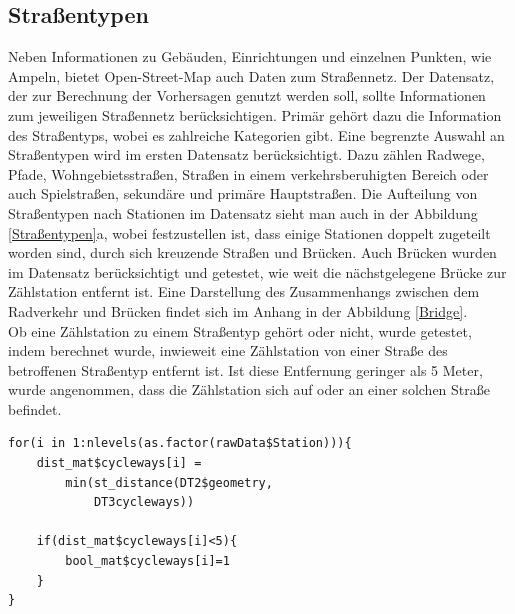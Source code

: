 \documentclass[a4paper,12pt]{thesis}
\begin{document}
\subsection{Straßentypen}

Neben Informationen zu Gebäuden, Einrichtungen und einzelnen Punkten, wie Ampeln, bietet Open-Street-Map auch Daten zum Straßennetz. Der Datensatz, der zur Berechnung der Vorhersagen genutzt werden soll, sollte Informationen zum jeweiligen Straßennetz berücksichtigen. Primär gehört dazu die Information des Straßentyps, wobei es zahlreiche Kategorien gibt. Eine begrenzte Auswahl an Straßentypen wird im ersten Datensatz berücksichtigt. Dazu zählen Radwege, Pfade, Wohngebietsstraßen, Straßen in einem verkehrsberuhigten Bereich oder auch Spielstraßen, sekundäre und primäre Hauptstraßen. Die Aufteilung von Straßentypen nach Stationen im Datensatz sieht man auch in der Abbildung \ref{Straßentypen}a, wobei festzustellen ist, dass einige Stationen doppelt zugeteilt worden sind, durch sich kreuzende Straßen und Brücken. Auch Brücken wurden im Datensatz berücksichtigt und getestet, wie weit die nächstgelegene Brücke zur Zählstation entfernt ist. Eine Darstellung des Zusammenhangs zwischen dem Radverkehr und Brücken findet sich im Anhang in der Abbildung \ref{Bridge}.\\

Ob eine Zählstation zu einem Straßentyp gehört oder nicht, wurde getestet, indem berechnet wurde, inwieweit eine Zählstation von einer Straße des betroffenen Straßentyp entfernt ist. Ist diese Entfernung geringer als 5 Meter, wurde angenommen, dass die Zählstation sich auf oder an einer solchen Straße befindet. 

\begin{minipage}{\linewidth}
\begin{lstlisting}[caption={Teste den Straßentyp},label=code:streettype_a]
for(i in 1:nlevels(as.factor(rawData$Station))){
	dist_mat$cycleways[i] =
		min(st_distance(DT2$geometry, 
			DT3cycleways))
			
	if(dist_mat$cycleways[i]<5){
		bool_mat$cycleways[i]=1
	}
}
\end{lstlisting}
\end{minipage}
\end{document}
